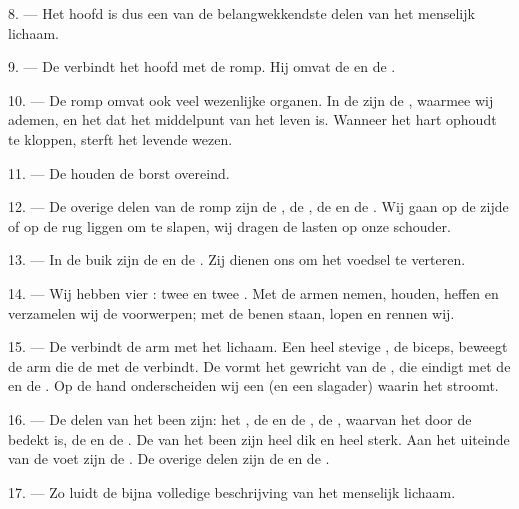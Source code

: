 8. --- Het hoofd is dus een van de belangwekkendste delen van het menselijk lichaam.

\VUsaut{4.4mm}
\VUsaut{3.0mm}

9. --- De  verbindt het hoofd met de romp. Hij omvat de
 en de .

10. --- De romp omvat ook veel wezenlijke organen. In de  zijn de
, waarmee wij ademen, en het  dat het middelpunt van
het leven is. Wanneer het hart ophoudt te kloppen, sterft het levende wezen.

11. --- De  houden de borst overeind.

12. --- De overige delen van de romp zijn de , de , de
 en de . Wij gaan op de zijde of op de rug liggen
om te slapen, wij dragen de lasten op onze schouder.

13. --- In de buik zijn de  en de . Zij dienen ons om het voedsel
te verteren.

\VUsaut{4.4mm}
\VUsaut{3.0mm}

14. --- Wij hebben vier : twee  en twee
. Met de armen nemen, houden, heffen en verzamelen wij de
voorwerpen; met de benen staan, lopen en rennen wij.

15. --- De  verbindt de arm met het lichaam. Een heel stevige
, de biceps, beweegt de arm die de  met de
 verbindt. De  vormt het gewricht van de
, die eindigt met de  en de . Op de
hand onderscheiden wij een  (en een slagader) waarin het
 stroomt.

16. --- De delen van het been zijn: het , de  en de
, de , waarvan het  door de
 bedekt is, de  en de . De
 van het been zijn heel dik en heel sterk. Aan het uiteinde
van de voet zijn de . De overige delen zijn de  en de
.

17. --- Zo luidt de bijna volledige beschrijving van het menselijk lichaam.

